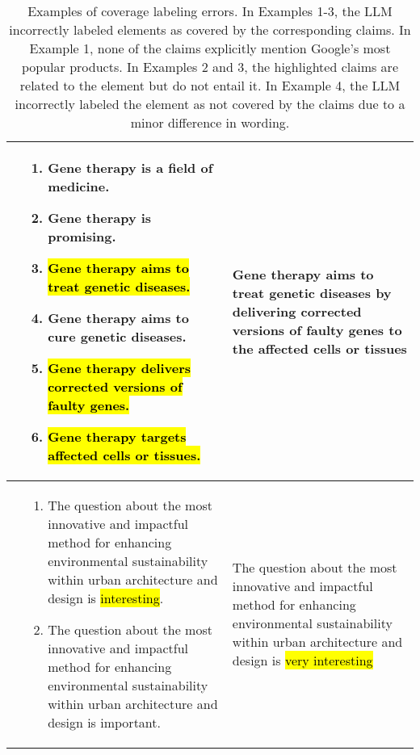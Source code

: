 \begin{table*}[ht]
{\begin{tabular}{
        >{\centering\arraybackslash}p{1.5cm}  
        >{\centering\arraybackslash}p{8cm}    
        >{\centering\arraybackslash}p{7cm}    
    }
        3 & 
        \parbox[t]{8cm}{
        \vspace*{-6pt}
        \begin{enumerate}[nosep]
            \item Gene therapy is a field of medicine.
            \item Gene therapy is promising.
            \item {}\hl{Gene therapy aims to treat genetic diseases.}
            \item Gene therapy aims to cure genetic diseases.
            \item {}\hl{Gene therapy delivers corrected versions of faulty genes.}
            \item {}\hl{Gene therapy targets affected cells or tissues.}
        \vspace*{6pt}
        \end{enumerate}}
        & 
        \parbox[t]{7cm}{Gene therapy aims to treat genetic diseases by delivering corrected versions of faulty genes to the affected cells or tissues} \\
        \midrule

        4 & 
        \parbox[t]{8cm}{
        \vspace*{-6pt}
        \begin{enumerate}[nosep]
            \item The question about the most innovative and impactful method for enhancing environmental sustainability within urban architecture and design is \hl{interesting}.
            \item The question about the most innovative and impactful method for enhancing environmental sustainability within urban architecture and design is important.
        \vspace*{6pt}
        \end{enumerate}}
        & 
        \parbox[t]{7cm}{The question about the most innovative and impactful method for enhancing environmental sustainability within urban architecture and design is \hl{very interesting}} \\
        \bottomrule
    \end{tabular}
    } 

    \caption{Examples of coverage labeling errors. In Examples 1-3, the LLM incorrectly labeled elements as covered by the corresponding claims. In Example 1, none of the claims explicitly mention Google’s most popular products. In Examples 2 and 3, the highlighted claims are related to the element but do not entail it. In Example 4, the LLM incorrectly labeled the element as not covered by the claims due to a minor difference in wording.}
    \label{tab:coverage_errors}
\end{table*}
